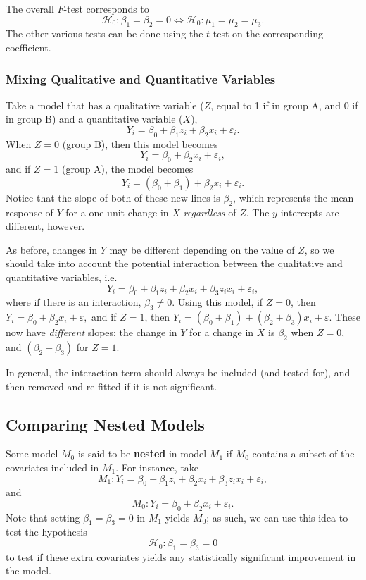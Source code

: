 \documentclass[12pt]{article}
\begin{document}
The overall $F$-test corresponds to \[\mathcal{H}_0: \beta_1 = \beta_2 = 0 \Leftrightarrow  \mathcal{H}_0: \mu_1 = \mu_2 = \mu_3.\] The other various tests can be done using the $t$-test on the corresponding coefficient.

\subsubsection{Mixing Qualitative and Quantitative Variables}

Take a model that has a qualitative variable ($Z$, equal to 1 if in group A, and 0 if in group B) and a quantitative variable ($X$), \[Y_i = \beta_0 + \beta_1 z_i + \beta_2 x_i + \varepsilon_i.\] When $Z = 0$ (group B), then this model becomes \[Y_i = \beta_0 + \beta_2 x_i + \varepsilon_i,\] and if $Z = 1$ (group A), the model becomes \[Y_i = (\beta_0 + \beta_1) + \beta_2 x_i + \varepsilon_i.\] Notice that the slope of both of these new lines is $\beta_2$, which represents the mean response of $Y$ for a one unit change in $X$ \textit{regardless} of $Z$. The $y$-intercepts are different, however.

As before, changes in $Y$ may be different depending on the value of $Z$, so we should take into account the potential interaction between the qualitative and quantitative variables, i.e. \[Y_i = \beta_0 + \beta_1 z_i + \beta_2 x_i + \beta_3 z_i x_i + \varepsilon_i,\] where if there is an interaction, $\beta_3 \neq 0$. Using this model, if $Z = 0$, then $Y_i = \beta_0 + \beta_2 x_i + \varepsilon,$ and if $Z = 1$, then $Y_i = (\beta_0 + \beta_1) + (\beta_2  + \beta_3) x_i + \varepsilon.$ These now have \textit{different} slopes; the change in $Y$ for a change in $X$ is $\beta_2$ when $Z = 0$, and $(\beta_2 + \beta_3)$ for $Z = 1$.

In general, the interaction term should always be included (and tested for), and then removed and re-fitted if it is not significant.

\subsection{Comparing Nested Models}

Some model $M_0$ is said to be \textbf{nested} in model $M_1$ if $M_0$ contains a subset of the covariates included in $M_1$. For instance, take \[M_1: Y_i = \beta_0 + \beta_1 z_i + \beta_2 x_i + \beta_3 z_i x_i + \varepsilon_i,\] and \[M_0: Y_i = \beta_0 + \beta_2 x_i + \varepsilon_i.\] Note that setting $\beta_1 = \beta_3 = 0$ in $M_1$ yields $M_0$; as such, we can use this idea to test the hypothesis \[\mathcal{H}_0: \beta_1 = \beta_3 = 0\] to test if these extra covariates yields any statistically significant improvement in the model.
\end{document}

